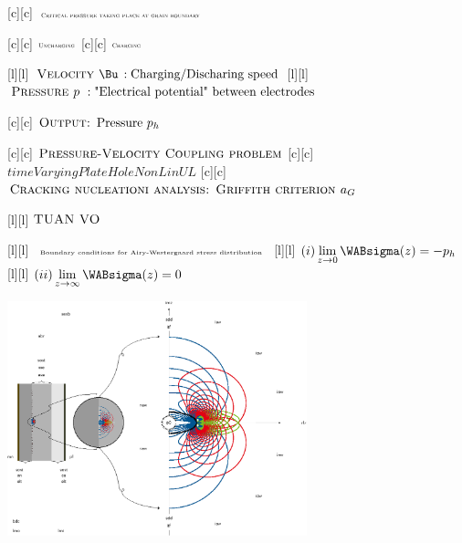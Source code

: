 [c][c] {$\textsc{\tiny Critical pressure taking place at grain boundary}$}

[c][c] {$\textsc{\tiny Uncharging}$}
[c][c] {$\textsc{\tiny Charging}$}

[l][l] {$\textsc{Velocity } \Bu \, :\text{Charging/Discharing speed}$}
[l][l] {$\textsc{Pressure } p   \,\, :\text{"Electrical potential" between electrodes}$}

[c][c] {$\textsc{Output: } \text{Pressure } p_h$}

[c][c] {$\textsc{Pressure-Velocity Coupling problem}$}
[c][c] {$timeVaryingPlateHoleNonLinUL$}
[c][c] {$\textsc{Cracking nucleationi analysis: Griffith criterion } a_{G}$}

[l][l] {$\textsc{TUAN VO}$}

[l][l] {$\tiny \text{Boundary conditions for Airy-Westergaard stress distribution}$}
[l][l] {\tiny $\displaystyle (i) \lim_{z\to 0} \WABsigma(z) = -p_h$}
[l][l] {\tiny $\displaystyle (ii) \lim_{z\to \infty} \WABsigma(z) = 0$}

\includegraphics[width=0.65\textwidth]{routine_woTV_spectral_boschcolor.eps}